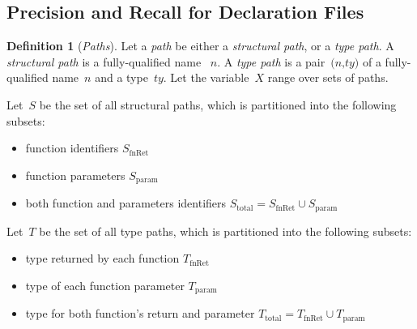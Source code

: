 \documentclass[sigplan,10pt,anonymous]{acmart} %
\theoremstyle{plain}
\theoremstyle{remark}
\theoremstyle{definition}
\newtheorem{defn}{Definition}[section]
\begin{document}
\subsection{Precision and Recall for Declaration Files}

\begin{defn}[\emph{Paths}]
  Let a \emph{path} be either a \emph{structural path}, or a
  \emph{type path}.
  A \emph{structural path} is a fully-qualified name
  ~$\textit{n}$.
  A \emph{type path} is a pair~$\textit{(n,ty)}$ of a fully-qualified name~$\textit{n}$ and a type~$\textit{ty}$.
  Let the variable~$X$ range over sets of paths.
\end{defn}

Let~$S$ be the set of all structural paths,
which is partitioned into the following subsets:
\begin{itemize}[label={\tiny$\bullet$}]
  \item function identifiers $S_\text{fnRet}$
  \item function  parameters $S_\text{param}$
  \item both function and parameters identifiers $S_\text{total} = S_\text{fnRet} \cup S_\text{param}$
\end{itemize}

Let~$T$ be the set of all type paths,
which is partitioned into the following subsets:
\begin{itemize}[label={\tiny$\bullet$}]
  \item type returned by each function $T_\text{fnRet}$
  \item type of each function parameter $T_\text{param}$
  \item type for both function's return and parameter $T_\text{total} = T_\text{fnRet} \cup T_\text{param}$
\end{itemize}
\end{document}
